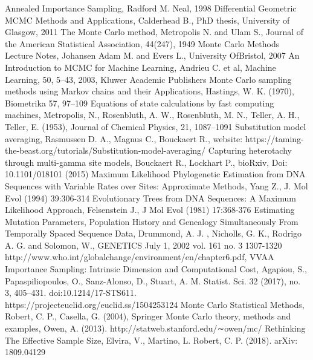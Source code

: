 \documentclass[12pt,mythesisstyle]{report}
\begin{document}
\begin{thebibliography}{99}
	Annealed Importance Sampling, Radford M. Neal, 1998
	Differential Geometric MCMC Methods and Applications, Calderhead B., PhD thesis, University of Glasgow, 2011
	The Monte Carlo method, Metropolis N. and Ulam S.,  Journal of the American Statistical Association, 44(247), 1949
	Monte Carlo Methods Lecture Notes,  Johansen Adam M. and Evers L., University OfBristol, 2007
	An Introduction to MCMC for Machine Learning, Andrieu C. et al, Machine Learning, 50, 5–43, 2003, Kluwer Academic Publishers
	 Monte Carlo sampling methods using Markov chains and their Applications, Hastings, W. K. (1970), Biometrika 57, 97–109
	 Equations of state
	calculations by fast computing machines, Metropolis, N., Rosenbluth, A. W., Rosenbluth, M. N., Teller, A. H., Teller, E. (1953), Journal of Chemical Physics, 21, 1087–1091
	Substitution model averaging, Rasmussen D. A., Magnus C., Bouckaert R., website: https://taming-the-beast.org/tutorials/Substitution-model-averaging/
	Capturing heterotachy through multi-gamma site models, Bouckaert R., Lockhart P., bioRxiv, Doi: 10.1101/018101 (2015)
	Maximum Likelihood Phylogenetic Estimation from DNA Sequences with Variable Rates over Sites: Approximate Methods, Yang Z., J. Mol Evol (1994) 39:306-314
	Evolutionary Trees from DNA Sequences: A Maximum Likelihood Approach, Felsenstein J., J Mol Evol (1981) 17:368-376
	Estimating  Mutation  Parameters,  Population  History  and  Genealogy Simultaneously From Temporally Spaced Sequence Data, Drummond, A. J. , Nicholls, G. K., Rodrigo A. G. and Solomon, W., GENETICS July 1, 2002 vol. 161 no. 3 1307-1320
	http://www.who.int/globalchange/environment/en/chapter6.pdf, 
	VVAA
	Importance Sampling: Intrinsic Dimension and Computational Cost,  Agapiou, S., Papaspiliopoulos, O., Sanz-Alonso, D., Stuart, A. M. 
	Statist. Sci. 32 (2017), no. 3, 405--431. doi:10.1214/17-STS611. https://projecteuclid.org/euclid.ss/1504253124
	 Monte Carlo Statistical Methods, Robert, C. P., Casella, G. (2004),  Springer
	 Monte Carlo theory, methods and examples, Owen, A. (2013).  http://statweb.stanford.edu/∼owen/mc/
	 Rethinking The Effective Sample Size, Elvira, V., Martino, L. Robert, C. P. (2018).  arXiv: 1809.04129

\end{thebibliography}
\end{document}
